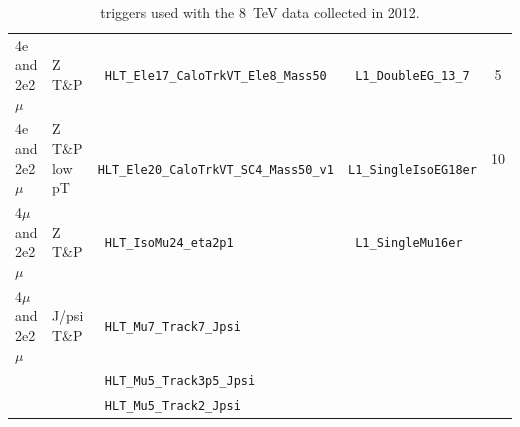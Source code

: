 \begin{table}[h]
\begin{tabular}{|l|l||l|l|c|}
\hline %
4e and 2e2$\mu$ & Z T\&P         & \verb| HLT_Ele17_CaloTrkVT_Ele8_Mass50 |                        & \verb| L1_DoubleEG_13_7 |   & 5      \\
4e and 2e2$\mu$ & Z T\&P low pT  & \verb| HLT_Ele20_CaloTrkVT_SC4_Mass50_v1  |                     & \verb| L1_SingleIsoEG18er | & 10     \\
4$\mu$ and 2e2$\mu$ & Z T\&P     & \verb| HLT_IsoMu24_eta2p1|                                      & \verb| L1_SingleMu16er |    &        \\
4$\mu$ and 2e2$\mu$ & J/psi T\&P & \verb| HLT_Mu7_Track7_Jpsi   |                                  &                             &        \\
                    &            & \verb| HLT_Mu5_Track3p5_Jpsi  |                                 &                             &        \\
                    &            & \verb| HLT_Mu5_Track2_Jpsi   |                                  &                             &        \\
\hline %
    \end{tabular}
\small
    \caption{
    triggers used with the 8~TeV data collected in 2012.
    }
    \label{tab:triggers_2012}
\end{table}
